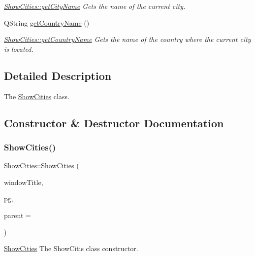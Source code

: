 \begin{DoxyCompactItemize}
\begin{DoxyCompactList}\small\item\em \hyperlink{class_show_cities_a3640b91c66939d0070c3dd6f5b9eb93c}{Show\+Cities\+::get\+City\+Name} Gets the name of the current city. \end{DoxyCompactList}\item 
Q\+String \hyperlink{class_show_cities_a93cf32e7ef19a182d0022c9c888392aa}{get\+Country\+Name} ()
\begin{DoxyCompactList}\small\item\em \hyperlink{class_show_cities_a93cf32e7ef19a182d0022c9c888392aa}{Show\+Cities\+::get\+Country\+Name} Gets the name of the country where the current city is located. \end{DoxyCompactList}\end{DoxyCompactItemize}


\subsection{Detailed Description}
The \hyperlink{class_show_cities}{Show\+Cities} class. 

\subsection{Constructor \& Destructor Documentation}
\mbox{\label{class_show_cities_a71a514390bebd22b5e6ecbb6b731979a}} 
\subsubsection{\texorpdfstring{Show\+Cities()}{ShowCities()}}
{\footnotesize\ttfamily Show\+Cities\+::\+Show\+Cities (\begin{DoxyParamCaption}\item[{Q\+String}]{window\+Title,  }\item[{\hyperlink{classpsql}{psql} $\ast$}]{pg,  }\item[{Q\+Widget $\ast$}]{parent = {} }\end{DoxyParamCaption})\hspace{0.3cm}{\ttfamily [explicit]}}



\hyperlink{class_show_cities}{Show\+Cities} The Show\+Citis class constructor. 


